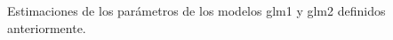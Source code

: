\documentclass[
  letterpaper,
  DIV=11,
  numbers=noendperiod,
  oneside]{scrreprt}
\begin{document}
\begin{table}

\caption{Estimaciones de los parámetros de los modelos glm1 y glm2
definidos anteriormente.}\begin{minipage}[t]{\linewidth}

{\centering 

}

\end{minipage}%
\newline
\begin{minipage}[t]{\linewidth}

{\centering 

}

\end{minipage}%
\newline
\begin{minipage}[t]{\linewidth}

{\centering 

}

\end{minipage}%
\newline
\begin{minipage}[t]{\linewidth}

{\centering 

}

\end{minipage}%
\newline
\begin{minipage}[t]{\linewidth}

{\centering 

}

\end{minipage}%
\newline
\begin{minipage}[t]{\linewidth}

{\centering 

}

\end{minipage}%
\newline
\begin{minipage}[t]{\linewidth}

{\centering 

}

\end{minipage}%
\newline
\begin{minipage}[t]{\linewidth}

{\centering 

}


\end{minipage}
\end{table}
\end{document}
